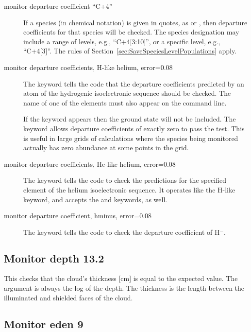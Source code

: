 \begin{description}

\item[monitor departure coefficient ``C+4'']
If a species (in chemical notation) is given in quotes,
as  or ,
then departure coefficients for that species will be checked.
The species designation may include a range of levels,
e.g., ``C+4[3:10]'', or a specific level, e.g., ``C+4[3]''.
The rules of Section~\ref{sec:SaveSpeciesLevelPopulations} apply.

\item[monitor departure coefficients, H-like helium, error=0.08]
The keyword
 tells the code that the departure coefficients predicted by an atom
of the hydrogenic isoelectronic sequence should be checked.  The name of
one of the elements must also appear on the command line.

If the keyword  appears then the ground state will not be included.
The keyword  allows departure coefficients of exactly zero to pass
the test.  This is useful in large grids of calculations where the species
being monitored actually has zero abundance at some points in the grid.

\item[monitor departure coefficients, He-like helium, error=0.08]
The keyword  tells the code to check the predictions
for the specified element of the helium isoelectronic sequence.
It operates like the H-like keyword, and accepts the 
and  keywords, as well.

\item[monitor departure coefficient, hminus, error=0.08]
The keyword  tells the code to check
the departure coefficient of H$^-$.
\end{description}

\subsection{Monitor depth 13.2}

This checks that the cloud's thickness [cm] is equal to the expected
value.
The argument is always the log of the depth.
The thickness is the
length between the illuminated and shielded faces of the cloud.

\subsection{Monitor eden 9}

